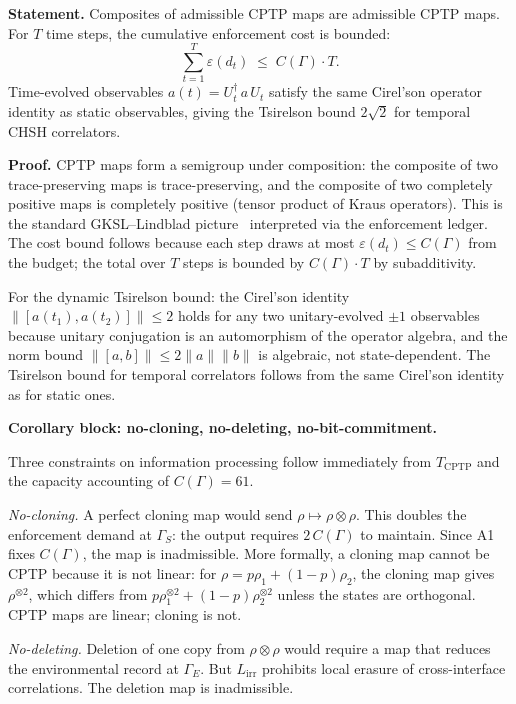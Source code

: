 \documentclass[11pt]{article}
\newcommand{\epitag}[1]{\textbf{[#1]}}
\begin{document}
\begin{tcolorbox}[apfbox, title={Theorem $T_{\mathrm{seq}}$ (Sequential Admissibility) \epitag{P}}]
\textbf{Statement.}
Composites of admissible CPTP maps are admissible CPTP maps.  For $T$ time
steps, the cumulative enforcement cost is bounded:
\[
  \sum_{t=1}^{T} \varepsilon(d_t) \;\leq\; C(\Gamma)\cdot T.
\]
Time-evolved observables $a(t) = U_t^\dagger\,a\,U_t$ satisfy the same
Cirel'son operator identity as static observables, giving the Tsirelson bound
$2\sqrt{2}$ for temporal CHSH correlators.

\textbf{Proof.}  CPTP maps form a semigroup under composition: the composite
of two trace-preserving maps is trace-preserving, and the composite of two
completely positive maps is completely positive (tensor product of Kraus
operators).  This is the standard GKSL--Lindblad picture~\cite{Lindblad1976,GKS1976}
interpreted via the enforcement ledger.  The cost bound follows because each
step draws at most $\varepsilon(d_t) \leq C(\Gamma)$ from the budget; the
total over $T$ steps is bounded by $C(\Gamma)\cdot T$ by subadditivity.

For the dynamic Tsirelson bound: the Cirel'son identity
$\|[a(t_1), a(t_2)]\| \leq 2$ holds for any two unitary-evolved $\pm 1$
observables because unitary conjugation is an automorphism of the operator
algebra, and the norm bound $\|[a,b]\| \leq 2\|a\|\|b\|$ is algebraic, not
state-dependent.  The Tsirelson bound for temporal correlators follows from
the same Cirel'son identity as for static ones.
\end{tcolorbox}

\medskip\noindent\textbf{Corollary block: no-cloning, no-deleting, no-bit-commitment.}

Three constraints on information processing follow immediately from
$T_{\mathrm{CPTP}}$ and the capacity accounting of $C(\Gamma) = 61$.

\smallskip\noindent\emph{No-cloning.}  A perfect cloning map would send
$\rho\mapsto\rho\otimes\rho$.  This doubles the enforcement demand at
$\Gamma_S$: the output requires $2\,C(\Gamma)$ to maintain.  Since A1 fixes
$C(\Gamma)$, the map is inadmissible.  More formally, a cloning map cannot
be CPTP because it is not linear: for $\rho = p\rho_1+(1-p)\rho_2$, the
cloning map gives $\rho^{\otimes 2}$, which differs from
$p\rho_1^{\otimes 2}+(1-p)\rho_2^{\otimes 2}$ unless the states are orthogonal.
CPTP maps are linear; cloning is not.

\smallskip\noindent\emph{No-deleting.}  Deletion of one copy from
$\rho\otimes\rho$ would require a map that reduces the environmental record
at $\Gamma_E$.  But $L_{\mathrm{irr}}$ prohibits local erasure of
cross-interface correlations.  The deletion map is inadmissible.
\end{document}
